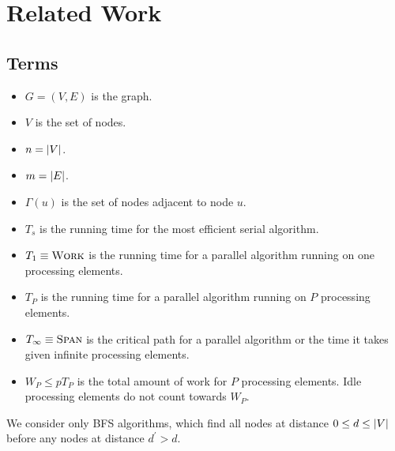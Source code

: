 \section{Related Work}

\subsection{Terms}
\begin{itemize}
    \item $G=(V,E)$ is the graph.
    \item $V$ is the set of nodes.
    \item $n=\left|V\right|$.
    \item $m=\left|E\right|$.
    \item $\Gamma(u)$ is the set of nodes adjacent to node $u$.
    \item $T_s$ is the running time for the most efficient serial algorithm.
    \item $T_1 \equiv \relax{\textrm{\bf{\sc{Work}}}}$ is the running time for a parallel algorithm running on one processing elements.
    \item $T_P$ is the running time for a parallel algorithm running on $P$ processing elements.
    \item $T_\infty \equiv \relax{\textrm{\bf{\sc{Span}}}}$ is the critical path for a parallel algorithm or the time it takes given infinite processing elements.
    \item $W_P \leq pT_P$ is the total amount of work for $P$ processing elements.  Idle processing elements do not count towards $W_P$.
\end{itemize}


We consider only  BFS algorithms, which find all nodes at distance $0\leq d \leq \left|V\right|$ before any nodes at distance $d^\prime > d$.

